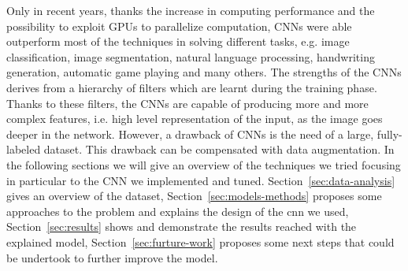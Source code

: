 \documentclass[10pt,conference,compsocconf]{IEEEtran}
\begin{document}
Only in recent years, thanks the increase in computing performance and the possibility to exploit GPUs to parallelize computation, CNNs were able outperform most of the techniques in solving different tasks, e.g. image classification, image segmentation, natural language processing, handwriting generation, automatic game playing and many others. The strengths of the CNNs derives from a hierarchy of filters which are learnt during the training phase. Thanks to these filters, the CNNs are capable of producing more and more complex features, i.e. high level representation of the input, as the image goes deeper in the network. However, a drawback of CNNs is the need of a large, fully-labeled dataset. This drawback can be compensated with data augmentation.
In the following sections we will give an overview of the techniques we tried focusing in particular to the CNN we implemented and tuned. Section~\ref{sec:data-analysis} gives an overview of the dataset, Section~\ref{sec:models-methods} proposes some approaches to the problem and explains the design of the cnn we used, Section~\ref{sec:results} shows and demonstrate the results reached with the explained model, Section~\ref{sec:furture-work} proposes some next steps that could be undertook to further improve the model.
\end{document}
